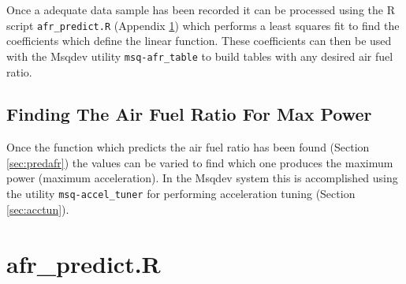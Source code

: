 \documentclass{article}
\begin{document}
Once a adequate data sample has been recorded it can be processed 
using the R script \verb+afr_predict.R+ (Appendix \ref{app:afrpred})
which performs a least squares fit to find the coefficients which define
the linear function.
These coefficients can then be used with the Msqdev utility \verb+msq-afr_table+
to build tables with any desired air fuel ratio.

\FloatBarrier  %

\subsection{Finding The Air Fuel Ratio For Max Power}
\label{sec:findafrpow}

Once the function which predicts the air fuel ratio has been found
(Section \ref{sec:predafr}) the values can be varied to find which
one produces the maximum power (maximum acceleration).
In the Msqdev system this is accomplished using the utility
\verb+msq-accel_tuner+ for performing acceleration tuning (Section \ref{sec:acctun}).

\appendix
\section{afr\_predict.R}
\label{app:afrpred}



\pagebreak


%
%
%

\end{document}
